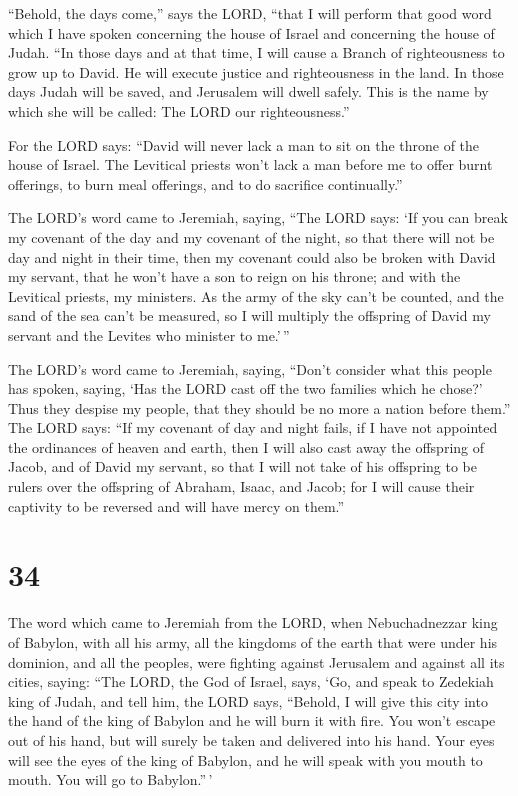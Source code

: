  ``Behold, the days come,'' says the LORD, ``that I will
perform that good word which I have spoken concerning the house of
Israel and concerning the house of Judah.  ``In those days
and at that time, I will cause a Branch of righteousness to grow up to
David. He will execute justice and righteousness in the land.
 In those days Judah will be saved, and Jerusalem will
dwell safely. This is the name by which she will be called: The LORD our
righteousness.''

 For the LORD says: ``David will never lack a man to sit on
the throne of the house of Israel.  The Levitical priests
won't lack a man before me to offer burnt offerings, to burn meal
offerings, and to do sacrifice continually.''

 The LORD's word came to Jeremiah, saying, 
``The LORD says: `If you can break my covenant of the day and my
covenant of the night, so that there will not be day and night in their
time,  then my covenant could also be broken with David my
servant, that he won't have a son to reign on his throne; and with the
Levitical priests, my ministers.  As the army of the sky
can't be counted, and the sand of the sea can't be measured, so I will
multiply the offspring of David my servant and the Levites who minister
to me.'\,''

 The LORD's word came to Jeremiah, saying, 
``Don't consider what this people has spoken, saying, `Has the LORD cast
off the two families which he chose?' Thus they despise my people, that
they should be no more a nation before them.''  The LORD
says: ``If my covenant of day and night fails, if I have not appointed
the ordinances of heaven and earth,  then I will also cast
away the offspring of Jacob, and of David my servant, so that I will not
take of his offspring to be rulers over the offspring of Abraham, Isaac,
and Jacob; for I will cause their captivity to be reversed and will have
mercy on them.''

\hypertarget{section-33}{%
\section{34}\label{section-33}}

 The word which came to Jeremiah from the LORD, when
Nebuchadnezzar king of Babylon, with all his army, all the kingdoms of
the earth that were under his dominion, and all the peoples, were
fighting against Jerusalem and against all its cities, saying:
 ``The LORD, the God of Israel, says, `Go, and speak to
Zedekiah king of Judah, and tell him, the LORD says, ``Behold, I will
give this city into the hand of the king of Babylon and he will burn it
with fire.  You won't escape out of his hand, but will
surely be taken and delivered into his hand. Your eyes will see the eyes
of the king of Babylon, and he will speak with you mouth to mouth. You
will go to Babylon.''\,'

